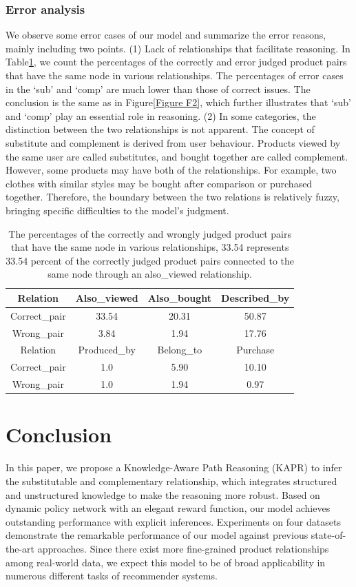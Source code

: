 \documentclass[review]{elsarticle}
\begin{document}
\begin{sloppypar}
\subsubsection{Error analysis}
We observe some error cases of our model and summarize the error reasons, mainly including two points.
(1) Lack of relationships that facilitate reasoning.
In Table\ref{Table 8}, we count the percentages of the correctly and error judged product pairs that have the same node in various relationships.
The percentages of error cases in the `sub' and `comp' are much lower than those of correct issues.
The conclusion is the same as in Figure\ref{Figure F2}, which further illustrates that `sub' and `comp' play an essential role in reasoning.
(2) In some categories, the distinction between the two relationships is not apparent. The concept of substitute and complement is derived from user behaviour.
Products viewed by the same user are called substitutes, and bought together are called complement.
However, some products may have both of the relationships.
For example, two clothes with similar styles may be bought after comparison or purchased together.
Therefore, the boundary between the two relations is relatively fuzzy, bringing specific difficulties to the model's judgment.
\begin{table}[]
\caption{The percentages of the correctly and wrongly judged product pairs that have the same node in various relationships, 33.54 represents 33.54 percent of the correctly judged product pairs connected to the same node through an also\_viewed relationship.}
\centering
\small
\begin{tabular}{c|ccc}
\hline
Relation      & Also\_viewed          & Also\_bought       & Described\_by \\ \hline
Correct\_pair & 33.54        & 20.31      & 50.87         \\
Wrong\_pair   & 3.84         & 1.94       & 17.76          \\ \hline
Relation      & Produced\_by & Belong\_to & Purchase      \\ \hline
Correct\_pair & 1.0          & 5.90       & 10.10         \\
Wrong\_pair   & 1.0          & 1.94       & 0.97          \\ \hline
\end{tabular}
\label{Table 8}
\end{table}
\section{Conclusion}
In this paper, we propose a Knowledge-Aware Path Reasoning (KAPR) to infer the substitutable and complementary relationship, which integrates structured and unstructured knowledge to make the reasoning more robust. 
Based on dynamic policy network with an elegant reward function, our model achieves outstanding performance with explicit inferences. Experiments on four datasets demonstrate the remarkable performance of our model against previous state-of-the-art approaches. Since there exist more fine-grained product relationships among real-world data, we expect this model to be of broad applicability in numerous different tasks of recommender systems. 

\end{sloppypar}
\end{document}

